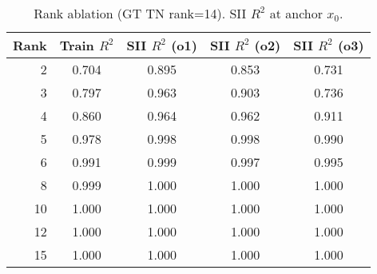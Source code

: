 \begin{table}[t]
\centering
\small
\begin{tabular}{rcccc}
\toprule
Rank & Train $R^2$ & SII $R^2$ (o1) & SII $R^2$ (o2) & SII $R^2$ (o3) \\
\midrule
2 & 0.704 & 0.895 & 0.853 & 0.731 \\
3 & 0.797 & 0.963 & 0.903 & 0.736 \\
4 & 0.860 & 0.964 & 0.962 & 0.911 \\
5 & 0.978 & 0.998 & 0.998 & 0.990 \\
6 & 0.991 & 0.999 & 0.997 & 0.995 \\
8 & 0.999 & 1.000 & 1.000 & 1.000 \\
10 & 1.000 & 1.000 & 1.000 & 1.000 \\
12 & 1.000 & 1.000 & 1.000 & 1.000 \\
15 & 1.000 & 1.000 & 1.000 & 1.000 \\
\bottomrule
\end{tabular}
\caption{Rank ablation (GT TN rank=14). SII $R^2$ at anchor $x_0$.}
\label{tab:rank-ablation}
\end{table}